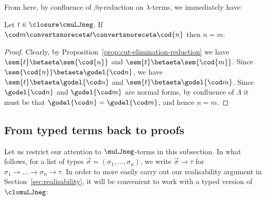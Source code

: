 From here, by confluence of $\beta\eta$-reduction on $\lambda$-terms, we immediately have:
\begin{corollary}[Uniqueness]\label{thm:uniqueness} Let $t \in \closure \cmuLJneg$. If $\cod m \convertsnoreceta t \convertsnoreceta \cod{n}$ then $n=m$.
\end{corollary}
\begin{proof}
    Clearly, by Proposition~\ref{prop:cut-elimination-reduction} we have $\sem{t} \betaeta \sem{\cod{n}}$ and $\sem{t} \betaeta \sem{\cod{m}}$. Since $\sem{\cod{n}}\betaeta \godel{\cod n}$, we have $\sem{t} \betaeta \godel{\cod n}$ and $\sem{t} \betaeta \godel{\cod m}$. Since $ \godel{\cod n}$ and $\godel{\cod m}$ are normal forms, by confluence of  $\Lambda$ it must be that  $ \godel{\cod n}=\godel{\cod m}$, and hence $n=m$.
\end{proof}









\subsection{From typed terms back to proofs}\label{subsec:from-typed-terms-back-to-proofs.}
Let us restrict our attention to $\muLJneg$-terms in this subsection. 
{In what follows, for a list of types $\vec \sigma=(\sigma_1, \ldots, \sigma_n)$,  we write  $\vec \sigma \to \tau$ for $\sigma_1 \to \ldots \to \sigma_n \to \tau$}.
In order to more easily carry out our realisability argument in Section~\ref{sec:realisability}, it will be convenient to work with a typed version of $\clomuLJneg$:

